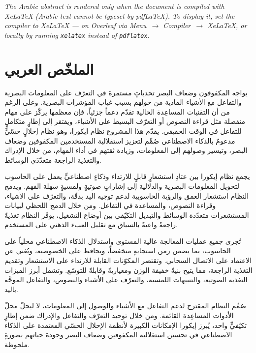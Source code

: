 \textit{The Arabic abstract is rendered only when the document is compiled with XeLaTeX (Arabic text cannot be typeset by pdfLaTeX). To display it, set the compiler to XeLaTeX --- on Overleaf via Menu~$\rightarrow$ Compiler~$\rightarrow$ XeLaTeX, or locally by running \texttt{xelatex} instead of \texttt{pdflatex}.}
\else
\chapter*{\textarabic{الملخّص العربي}}
\thispagestyle{plain}

\vspace{0.5cm}

\begin{arabic}
\setlength{\parindent}{0pt}

يواجه المكفوفون وضعاف البصر تحدياتٍ مستمرة في التعرّف على المعلومات البصرية والتفاعل مع الأشياء المادية من حولهم بسبب غياب المؤشرات البصرية. وعلى الرغم من أن التقنيات المساعِدة الحالية تقدّم دعماً جزئياً، فإن معظمها يركّز على مهام منفصلة مثل قراءة النصوص أو التعرّف البسيط على الأشياء، ويفتقر إلى إطارٍ متكاملٍ للتفاعل في الوقت الحقيقي. يقدّم هذا المشروع نظام إيكورا، وهو نظام إحلالٍ حسّيٍّ مدعومٌ بالذكاء الاصطناعي صُمِّم لتعزيز استقلالية المستخدمين المكفوفين وضعاف البصر، وتيسير وصولهم إلى المعلومات، وزيادة ثقتهم في أداء المهام، من خلال الإدراك والتغذية الراجعة متعدّدَي الوسائط.

يجمع نظام إيكورا بين عتادِ استشعارٍ قابلٍ للارتداء وذكاءٍ اصطناعيٍّ يعمل على الحاسوب لتحويل المعلومات البصرية والدلالية إلى إشاراتٍ صوتيةٍ ولمسيةٍ سهلة الفهم. ويدمج النظام استشعار العمق والرؤية الحاسوبية لدعم توجيه اليد بدقّة، والتعرّف على الأشياء، وقراءة النصوص، والمساعدة في التفاعل. ومن خلال الدمج اللحظي لبيانات المستشعرات متعدّدة الوسائط والتبديل التكيّفي بين أوضاع التشغيل، يوفّر النظام تغذيةً راجعةً واعيةً بالسياق مع تقليل العبء الذهني على المستخدم.

تُجرى جميع عمليات المعالجة عالية المستوى واستدلال الذكاء الاصطناعي محلياً على الحاسوب، بما يضمن زمن استجابةٍ منخفضاً، ويحافظ على الخصوصية، ويُغني عن الاعتماد على الاتصال السحابي. وتقتصر المكوّنات القابلة للارتداء على الاستشعار وتقديم التغذية الراجعة، مما يتيح بنيةً خفيفة الوزن ومعياريةً وقابلةً للتوسّع. وتشمل أبرز الميزات التغذية الصوتية، والتنبيهات اللمسية، والتعرّف على الأشياء والنصوص، والتفاعل الموجَّه باليد.

صُمِّم النظام المقترح لدعم التفاعل مع الأشياء والوصول إلى المعلومات، لا ليحلّ محلّ الأدوات المساعِدة القائمة. ومن خلال توحيد التعرّف والتفاعل والإدراك ضمن إطارٍ تكيّفيٍّ واحد، يُبرز إيكورا الإمكانات الكبيرة لأنظمة الإحلال الحسّي المعتمدة على الذكاء الاصطناعي في تحسين استقلالية المكفوفين وضعاف البصر وجودة حياتهم بصورةٍ ملحوظة.

\end{arabic}
\fi
